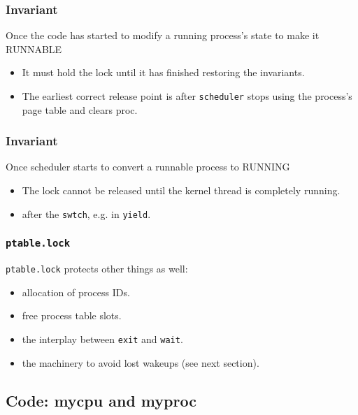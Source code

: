 \documentclass{beamer}
\begin{document}

\begin{frame}[t]
  \frametitle{Invariant}
  Once the code has started to modify a running process's state to make it RUNNABLE
  \begin{itemize}
  \item It must hold the lock until it has finished restoring the invariants.
  \item The earliest correct release point is after \texttt{scheduler} stops using the process's page table and clears proc.
  \end{itemize}
\end{frame}


\begin{frame}[t]
  \frametitle{Invariant}
  Once scheduler starts to convert a runnable process to RUNNING
  \begin{itemize}
  \item The lock cannot be released until the kernel thread is completely running.
  \item after the \texttt{swtch}, e.g. in \texttt{yield}.
  \end{itemize}
  
\end{frame}


\begin{frame}[t]
  \frametitle{\texttt{ptable.lock}}
  \texttt{ptable.lock} protects other things as well:
  \begin{itemize}
  \item allocation of process IDs.
  \item free process table slots.
  \item the interplay between \texttt{exit} and \texttt{wait}.
  \item the machinery to avoid lost wakeups (see next section).
  \end{itemize}
  
\end{frame}


\subsection{Code: mycpu and myproc}
\end{document}
